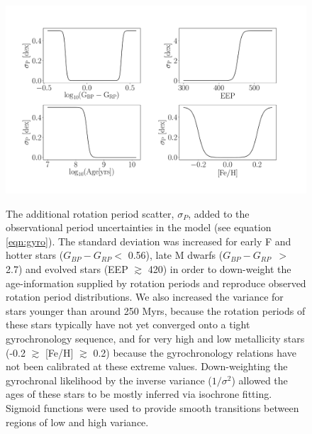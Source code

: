 \documentclass[useAMS, usenatbib, preprint, 12pt]{aastex}
\newcommand{\gcolor}{$G_{BP} - G_{RP}$}
\begin{document}
\begin{figure}
  \caption{
    The additional rotation period scatter, $\sigma_P$, added to the
    observational period uncertainties in the model (see equation
    \ref{eqn:gyro}).
    The standard deviation was increased for early F and hotter
    stars (\gcolor $<$ 0.56), late M dwarfs (\gcolor\ $>$ 2.7) and evolved
    stars (EEP $\gtrsim$ 420) in order to down-weight the age-information
    supplied
    by rotation periods and reproduce observed rotation period distributions.
    We also increased the variance for stars younger than around 250 Myrs,
    because the rotation periods of these stars typically have not yet
    converged onto a tight gyrochronology sequence, and for very high and low
    metallicity stars (-0.2 $\gtrsim$ [Fe/H] $\gtrsim$ 0.2) because the
    gyrochronology relations have not been calibrated at these extreme values.
    Down-weighting the gyrochronal likelihood by the inverse variance
    ($1/\sigma^2$) allowed the ages of these stars to be mostly inferred
    via isochrone fitting.
    Sigmoid functions were used to provide smooth transitions between regions
    of low and high variance.
}
  \centering
    \includegraphics[width=1.\textwidth]{variance}
\label{fig:variance}
\end{figure}
\end{document}
